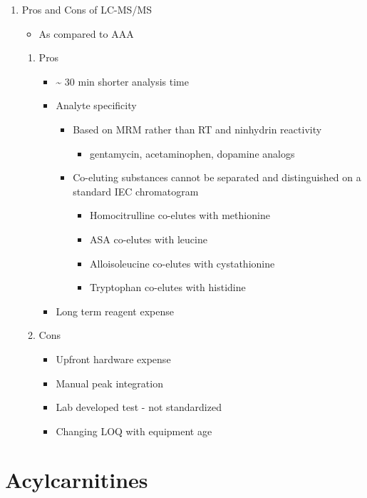 \documentclass{scrartcl}
\begin{document}
\begin{enumerate}
\item Pros and Cons of LC-MS/MS
\label{sec:orgfa98a86}
\begin{itemize}
\item As compared to AAA
\end{itemize}
\begin{enumerate}
\item Pros
\label{sec:orgdd0318a}
\begin{itemize}
\item \textasciitilde{} 30 min shorter analysis time
\item Analyte specificity
\begin{itemize}
\item Based on MRM rather than RT and ninhydrin reactivity
\begin{itemize}
\item gentamycin, acetaminophen, dopamine analogs
\end{itemize}
\item Co-eluting substances cannot be separated and distinguished on a
standard IEC chromatogram
\begin{itemize}
\item Homocitrulline co-elutes with methionine
\item ASA co-elutes with leucine
\item Alloisoleucine co-elutes with cystathionine
\item Tryptophan co-elutes with histidine
\end{itemize}
\end{itemize}
\item Long term reagent expense
\end{itemize}

\item Cons
\label{sec:org4cf010c}
\begin{itemize}
\item Upfront hardware expense
\item Manual peak integration
\item Lab developed test - not standardized
\item Changing LOQ with equipment age
\end{itemize}
\end{enumerate}
\end{enumerate}
\section{Acylcarnitines}
\label{sec:org8198260}
\end{document}

